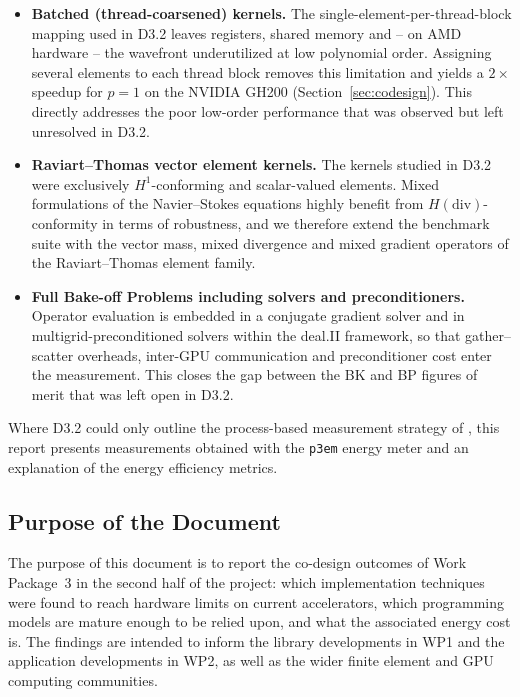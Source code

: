 \documentclass[a4paper,12pt]{article}
\begin{document}
\begin{itemize}
    \item \textbf{Batched (thread-coarsened) kernels.}
    The single-element-per-thread-block mapping used in D3.2 leaves registers, shared memory and -- on AMD hardware -- the wavefront underutilized at low polynomial order.
    Assigning several elements to each thread block removes this limitation and yields a $2\times$ speedup for $p=1$ on the NVIDIA GH200 (Section~\ref{sec:codesign}).
    This directly addresses the poor low-order performance that was observed but left unresolved in D3.2.
    \item \textbf{Raviart--Thomas vector element kernels.}
    The kernels studied in D3.2 were exclusively $H^1$-conforming and scalar-valued elements.
    Mixed formulations of the Navier--Stokes equations highly benefit from $H(\mathrm{div})$-conformity in terms of robustness, and we therefore extend the benchmark suite with the vector mass, mixed divergence and mixed gradient operators of the Raviart--Thomas element family.
    \item \textbf{Full Bake-off Problems including solvers and preconditioners.}
    Operator evaluation is embedded in a conjugate gradient solver and in multigrid-preconditioned solvers within the deal.II framework, so that gather--scatter overheads, inter-GPU communication and preconditioner cost enter the measurement.
    This closes the gap between the BK and BP figures of merit that was left open in D3.2.
\end{itemize}

Where D3.2 could only outline the process-based measurement strategy of \citet{Cielo25}, this report presents measurements obtained with the \texttt{p3em} energy meter and an explanation of the energy efficiency metrics.

\subsection{Purpose of the Document}

The purpose of this document is to report the co-design outcomes of Work Package~3 in the second half of the project: which implementation techniques were found to reach hardware limits on current accelerators, which programming models are mature enough to be relied upon, and what the associated energy cost is.
The findings are intended to inform the library developments in WP1 and the application developments in WP2, as well as the wider finite element and GPU computing communities.
\end{document}
